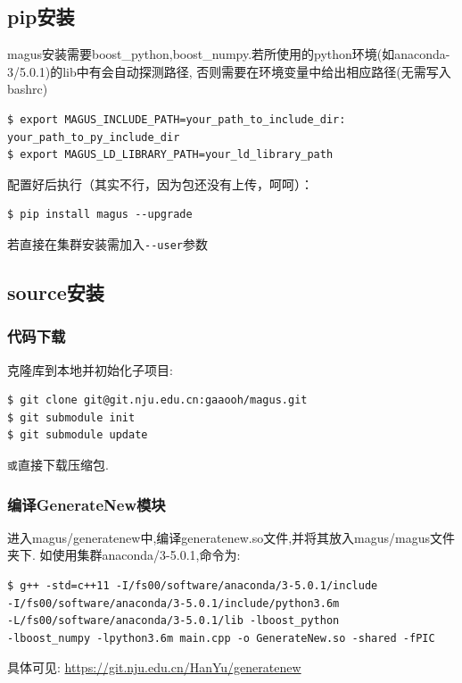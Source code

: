 \documentclass[12pt]{article}
\begin{document}
\subsection{pip安装}
magus安装需要boost\_python,boost\_numpy.若所使用的python环境(如anaconda-3/5.0.1)的lib中有会自动探测路径,
否则需要在环境变量中给出相应路径(无需写入bashrc)
\begin{tcolorbox}
    \begin{verbatim}
$ export MAGUS_INCLUDE_PATH=your_path_to_include_dir: your_path_to_py_include_dir
$ export MAGUS_LD_LIBRARY_PATH=your_ld_library_path
    \end{verbatim}
\end{tcolorbox}
配置好后执行（其实不行，因为包还没有上传，呵呵）：
\begin{tcolorbox}
    \begin{verbatim}
$ pip install magus --upgrade
    \end{verbatim}
\end{tcolorbox}

  若直接在集群安装需加入\verb|--user|参数
\subsection{source安装}
\subsubsection{代码下载}
克隆库到本地并初始化子项目:
\begin{tcolorbox}
    \begin{verbatim}
$ git clone git@git.nju.edu.cn:gaaooh/magus.git
$ git submodule init
$ git submodule update
    \end{verbatim}
\end{tcolorbox}
\texttt 
或直接下载压缩包.
\subsubsection{编译GenerateNew模块}
进入magus/generatenew中,编译generatenew.so文件,并将其放入magus/magus文件夹下.
如使用集群anaconda/3-5.0.1,命令为:
\begin{tcolorbox}
    \begin{verbatim}
$ g++ -std=c++11 -I/fs00/software/anaconda/3-5.0.1/include 
-I/fs00/software/anaconda/3-5.0.1/include/python3.6m 
-L/fs00/software/anaconda/3-5.0.1/lib -lboost_python 
-lboost_numpy -lpython3.6m main.cpp -o GenerateNew.so -shared -fPIC
    \end{verbatim}
\end{tcolorbox}
具体可见:
\textcolor{blue}{\url{https://git.nju.edu.cn/HanYu/generatenew}}
\end{document}
